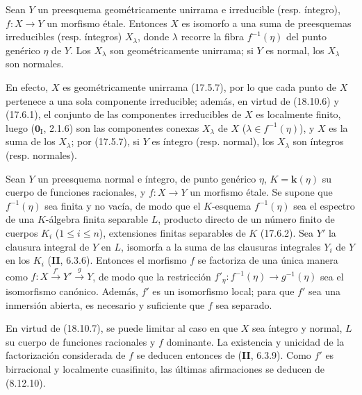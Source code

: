 \begin{proposition}[18.10.7]
\label{IV.18.10.7}
Sean $Y$ un preesquema geométricamente unirrama e irreducible \textup{(resp.} íntegro\textup{)}, $f:X\to Y$ un morfismo étale. Entonces $X$ es isomorfo a una suma de preesquemas irreducibles \textup{(resp.} íntegros\textup{)} $X_\lambda$, donde $\lambda$ recorre la fibra $f^{-1}(\eta)$ del punto genérico $\eta$ de $Y$. Los $X_\lambda$ son geométricamente unirrama; si $Y$ es normal, los $X_\lambda$ son normales.
\end{proposition}

En efecto, $X$ es geométricamente unirrama (17.5.7), por lo que cada punto de $X$ pertenece a una sola componente irreducible; además, en virtud de (18.10.6) y (17.6.1), el conjunto de las componentes irreducibles de $X$ es localmente finito, luego ($\mathbf{0}_{\mathrm I}$, 2.1.6) son las componentes conexas $X_\lambda$ de $X$ ($\lambda\in f^{-1}(\eta)$), y $X$ es la suma de los $X_\lambda$; por (17.5.7), si $Y$ es íntegro (resp. normal), los $X_\lambda$ son íntegros (resp. normales).

\begin{proposition}[18.10.8]
\label{IV.18.10.8}
Sean $Y$ un preesquema normal e íntegro, de punto genérico $\eta$, $K=\boldsymbol{k}(\eta)$ su cuerpo de funciones racionales, y $f:X\to Y$ un morfismo étale. Se supone que $f^{-1}(\eta)$ sea finita y no vacía, de modo que el $K$-esquema $f^{-1}(\eta)$ sea el espectro de una $K$-álgebra finita separable $L$, producto directo de un número finito de cuerpos $K_i$ \textup{($1\leq i\leq n$)}, extensiones finitas separables de $K$ \textup{(17.6.2)}. Sea $Y'$ la clausura integral de $Y$ en $L$, isomorfa a la suma de las clausuras integrales $Y_i$ de $Y$ en los $K_i$ \textup{(\textbf{II}, 6.3.6)}. Entonces el morfismo $f$ se factoriza de una única manera como $f:X\xrightarrow{f'}Y'\xrightarrow{g}Y$, de modo que la restricción $f'_\eta:f^{-1}(\eta)\to g^{-1}(\eta)$ sea el isomorfismo canónico. Además, $f'$ es un isomorfismo local; para que $f'$ sea una inmersión abierta, es necesario y suficiente que $f$ sea separado.
\end{proposition}

En virtud de (18.10.7), se puede limitar al caso en que $X$ sea íntegro y normal, $L$ su cuerpo de funciones racionales y $f$ dominante. La existencia y unicidad de la factorización considerada de $f$ se deducen entonces de (\textbf{II}, 6.3.9). Como $f'$ es birracional y localmente cuasifinito, las últimas afirmaciones se deducen de (8.12.10).

